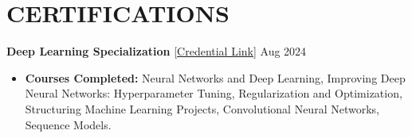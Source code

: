 \documentclass[a4paper]{extarticle}
\begin{document}
\section*{CERTIFICATIONS}
\noindent
\textbf{Deep Learning Specialization}
\href{https://www.coursera.org/account/accomplishments/specialization/LR4ZVQP24B9B}{[Credential
Link]} \hfill Aug 2024
\begin{itemize}
  \item \textbf{Courses Completed:} Neural Networks and Deep
    Learning, Improving Deep Neural Networks: Hyperparameter Tuning,
    Regularization and Optimization, Structuring Machine Learning
    Projects, Convolutional Neural Networks, Sequence Models.
\end{itemize}

\end{document}

